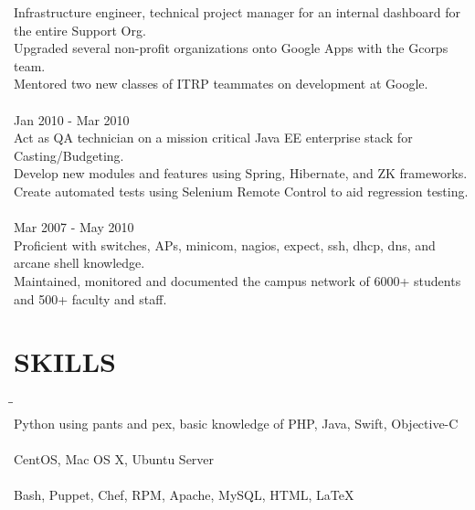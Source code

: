 \documentclass{res}
\begin{document}
\begin{resume}
\begin{tabbing}
    Infrastructure engineer, technical project manager for an internal dashboard for the entire Support Org.\\
    Upgraded several non-profit organizations onto Google Apps with the Gcorps team.\\
    Mentored two new classes of ITRP teammates on development at Google.\\
\\
  \hspace{-0.25in}{\bf IT Development Intern, Dreamworks Animation SKG} \> \> Jan 2010 - Mar 2010\\
    Act as QA technician on a mission critical Java EE enterprise stack for Casting/Budgeting.\\
    Develop new modules and features using Spring, Hibernate, and ZK frameworks.\\
    Create automated tests using Selenium Remote Control to aid regression testing.\\
\\
  \hspace{-0.25in}{\bf Student Network + Systems Admin, Chapman University IS\&T} \> \> Mar 2007 - May 2010\\
    Proficient with switches, APs, minicom, nagios, expect, ssh, dhcp, dns, and arcane shell knowledge.\\
    Maintained, monitored and documented the campus network of 6000+ students and 500+ faculty and staff.\\
  \end{tabbing}
  \vspace{-0.4in}

\section{SKILLS}
  \vspace{-5pt}
  \begin{tabbing}
  \hspace{2.5in}\= \hspace{3.45in}\= \kill %
  \hspace{-0.25in}{\bf Programming Languages} \> \> \\
    Python using pants and pex, basic knowledge of PHP, Java, Swift, Objective-C\\
  \hspace{-0.25in}{\bf Operating Systems} \> \> \\
    CentOS, Mac OS X, Ubuntu Server\\
  \hspace{-0.25in}{\bf Web Development and Systems Administration} \> \> \\
    Bash, Puppet, Chef, RPM, Apache, MySQL, HTML, \LaTeX\\
  \end{tabbing}
  \vspace{-0.4in}


\end{resume}
\end{document}
